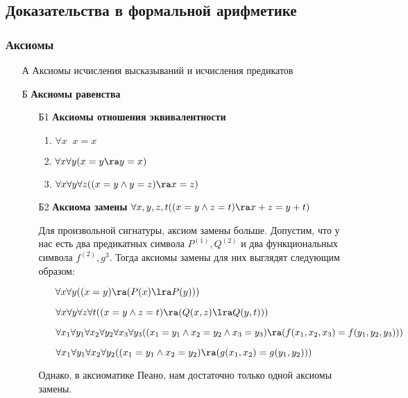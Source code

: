 \subsection{Доказательства в формальной арифметике}
\subsubsection{Аксиомы}
\begin{enumerate}
    \item[А] Аксиомы исчисления высказываний и исчисления предикатов
    \item[Б] \textbf{Аксиомы равенства} 
    \begin{enumerate}
        \item[Б1] \textbf{Аксиомы отношения эквивалентности}
        \begin{enumerate}
            \item \(\forall x\;\;x = x\)
            \item \(\forall x \forall y (x = y \ra y = x)\) 
            \item \(\forall x \forall y \forall z ((x = y \wedge y = z) \ra x = z)\)
        \end{enumerate}
        \item[Б2] \textbf{Аксиома замены} \(\forall x, y, z, t ((x = y \wedge z = t) \ra x + z = y + t)\)
        \begin{note}
            Для произвольной сигнатуры, аксиом замены больше. Допустим, что у нас есть два предикатных символа \(P^{(1)}, Q^{(2)}\) и два функциональных символа \(f^{(2)}, g^{3}\). Тогда аксиомы замены для них выглядят следующим образом:
            \begin{enumerate}
                \item[] \(\forall x \forall y((x = y) \ra (P(x) \lra  P(y)))\)
                \item[] \(\forall x \forall y \forall z \forall t((x = y \wedge z = t) \ra (Q(x, z) \lra  Q(y, t)))\)
                \item[] \(\forall x_1 \forall y_1 \forall x_2 \forall y_2 \forall x_3 \forall y_3((x_1 = y_1 \wedge x_2 = y_2 \wedge x_3 = y_3) \ra (f(x_1, x_2, x_3) = f(y_1, y_2, y_3)))\)
                \item[] \(\forall x_1 \forall y_1 \forall x_2 \forall y_2 ((x_1 = y_1 \wedge x_2 = y_2) \ra (g(x_1, x_2) = g(y_1, y_2)))\)
            \end{enumerate}
            Однако, в аксиоматике Пеано, нам достаточно только одной аксиомы замены.
        \end{note}

\end{enumerate}
\end{enumerate}
